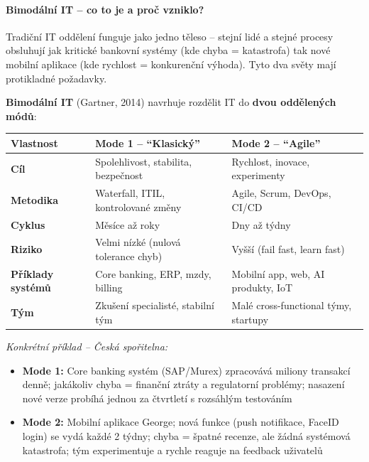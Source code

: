 \paragraph{Bimodální IT -- co to je a proč vzniklo?}

Tradiční IT oddělení funguje jako jedno těleso -- stejní lidé a stejné procesy obsluhují
jak kritické bankovní systémy (kde chyba = katastrofa) tak nové mobilní aplikace
(kde rychlost = konkurenční výhoda). Tyto dva světy mají protikladné požadavky.

\textbf{Bimodální IT} (Gartner, 2014) navrhuje rozdělit IT do \textbf{dvou oddělených módů}:

\begin{center}
\begin{tabular}{p{3cm}p{5cm}p{5cm}}
\toprule
\textbf{Vlastnost} & \textbf{Mode 1 -- ``Klasický''} & \textbf{Mode 2 -- ``Agile''} \\
\midrule
\textbf{Cíl} & Spolehlivost, stabilita, bezpečnost & Rychlost, inovace, experimenty \\
\textbf{Metodika} & Waterfall, ITIL, kontrolované změny & Agile, Scrum, DevOps, CI/CD \\
\textbf{Cyklus} & Měsíce až roky & Dny až týdny \\
\textbf{Riziko} & Velmi nízké (nulová tolerance chyb) & Vyšší (fail fast, learn fast) \\
\textbf{Příklady systémů} & Core banking, ERP, mzdy, billing & Mobilní app, web, AI produkty, IoT \\
\textbf{Tým} & Zkušení specialisté, stabilní tým & Malé cross-functional týmy, startupy \\
\bottomrule
\end{tabular}
\end{center}

\textit{Konkrétní příklad -- Česká spořitelna:}
\begin{itemize}
  \item \textbf{Mode 1:} Core banking systém (SAP/Murex) zpracovává miliony transakcí denně;
    jakákoliv chyba = finanční ztráty a regulatorní problémy; nasazení nové verze probíhá
    jednou za čtvrtletí s rozsáhlým testováním
  \item \textbf{Mode 2:} Mobilní aplikace George; nová funkce (push notifikace, FaceID login)
    se vydá každé 2 týdny; chyba = špatné recenze, ale žádná systémová katastrofa; tým
    experimentuje a rychle reaguje na feedback uživatelů
\end{itemize}

